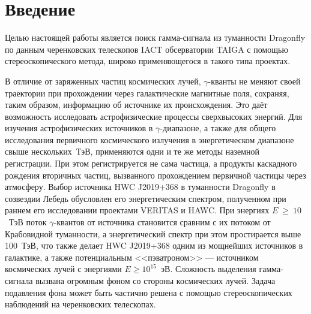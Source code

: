 \documentclass[magd,floatypics,numeref]{msudipl} %
\begin{document}
\author{Разумов Александр Юрьевич}
\maketitle


\tableofcontents   %

\chapter*{Введение}   %
Целью настоящей работы является поиск гамма-сигнала из туманности Dragonfly по данным черенковских телескопов IACT обсерватории TAIGA с помощью стереоскопического метода, широко применяющегося в такого типа проектах. 

В отличие от заряженных частиц космических лучей, $\gamma$-кванты не меняют своей траектории при прохождении через галактические магнитные поля, сохраняя, таким образом, информацию об источнике их происхождения. Это даёт возможность исследовать астрофизические процессы сверхвысоких энергий. Для изучения астрофизических источников в $\gamma$-диапазоне, а также для общего исследования первичного космического излучения в энергетическом диапазоне свыше нескольких~ТэВ, применяются одни и те же методы наземной регистрации. При этом регистрируется не сама частица, а продукты каскадного рождения вторичных частиц, вызванного прохождением первичной частицы через атмосферу. Выбор источника HWC J2019+368 в туманности Dragonfly в созвездии Лебедь обусловлен его энергетическим спектром, полученном при раннем его исследовании проектами VERITAS и HAWC. При энергиях $E~\geq~10$~ТэВ поток $\gamma$-квантов от источника становится сравним с их потоком от Крабовидной туманности, а энергетический спектр при этом простирается выше 100~ТэВ, что также делает HWC J2019+368 одним из мощнейших источников в галактике, а также потенциальным  <<пэватроном>> --- источником космических лучей с энергиями $E\geq10^{15}$~эВ. Сложность выделения гамма-сигнала вызвана огромным фоном со стороны космических лучей. Задача подавления фона может быть частично решена с помощью стереоскопических наблюдений на черенковских телескопах.
\end{document}
